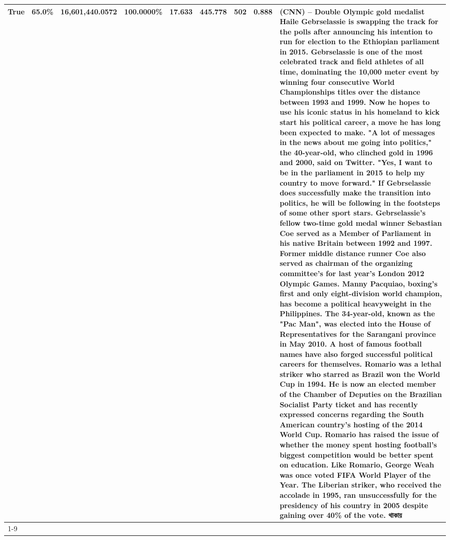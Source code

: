 \begin{table}[H]
{\begin{tabular}{lllrlllll}
True & 65.0\% & 16,601,440.0572 & \bfseries \color{red} 100.0000\% & 17.633 & 445.778 & 502 & 0.888 & (CNN) -- Double Olympic gold medalist Haile Gebrselassie is swapping the track for the polls after announcing his intention to run for election to the Ethiopian parliament in 2015. Gebrselassie is one of the most celebrated track and field athletes of all time, dominating the 10,000 meter event by winning four consecutive World Championships titles over the distance between 1993 and 1999. Now he hopes to use his iconic status in his homeland to kick start his political career, a move he has long been expected to make. "A lot of messages in the news about me going into politics," the 40-year-old, who clinched gold in 1996 and 2000, said on Twitter. "Yes, I want to be in the parliament in 2015 to help my country to move forward." If Gebrselassie does successfully make the transition into politics, he will be following in the footsteps of some other sport stars. Gebrselassie's fellow two-time gold medal winner Sebastian Coe served as a Member of Parliament in his native Britain between 1992 and 1997. Former middle distance runner Coe also served as chairman of the organizing committee's for last year's London 2012 Olympic Games. Manny Pacquiao, boxing's first and only eight-division world champion, has become a political heavyweight in the Philippines. The 34-year-old, known as the "Pac Man", was elected into the House of Representatives for the Sarangani province in May 2010. A host of famous football names have also forged successful political careers for themselves. Romario was a lethal striker who starred as Brazil won the World Cup in 1994. He is now an elected member of the Chamber of Deputies on the Brazilian Socialist Party ticket and has recently expressed concerns regarding the South American country's hosting of the 2014 World Cup. Romario has raised the issue of whether the money spent hosting football's biggest competition would be better spent on education. Like Romario, George Weah was once voted FIFA World Player of the Year. The Liberian striker, who received the accolade in 1995, ran unsuccessfully for the presidency of his country in 2005 despite gaining over 40\% of the vote. থাকায় \\
\cline{1-9}

\end{tabular}}
\end{table}
